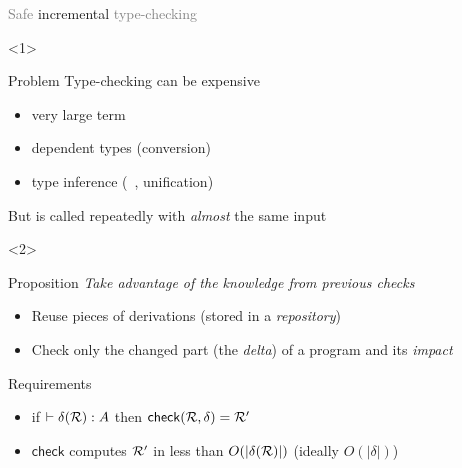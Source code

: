 \documentclass{beamer}
\theoremstyle{example}
\begin{document}
\begin{frame}{\textcolor{gray}{Safe} incremental
    \textcolor{gray}{type-checking}}


  \begin{onlyenv}<1>
    \begin{block}{Problem}
      Type-checking can be expensive
      \begin{example}
        \begin{itemize}
        \item very large term
        \item dependent types (conversion)
        \item type inference (\eg\ , unification)
        \end{itemize}
      \end{example}
      But is called repeatedly with \emph{almost} the same input
    \end{block}
  \end{onlyenv}

  \begin{onlyenv}<2>
    \begin{block}{Proposition}
      \emph{Take advantage of the knowledge from previous checks}
      \begin{itemize}
      \item Reuse pieces of derivations (stored in a \emph{repository})
      \item Check only the changed part (the \emph{delta}) of a
        program and its \emph{impact}
      \end{itemize}

        \centering
    \end{block}

    \begin{block}{Requirements}
      \begin{itemize}
      \item if $\vdash \delta(\mathcal{R}) : A$ then ${\rm\mathsf{check}}({\mathcal{R},
          \delta}) = \mathcal{R'}$
      \item $\mathsf{check}$ computes $\mathcal{R'}$ in less than $O(|\delta(\mathcal{R})|)$ \small\qquad (ideally
        $O(|\delta|)$)
      \end{itemize}
    \end{block}
  \end{onlyenv}

\end{frame}
\end{document}

